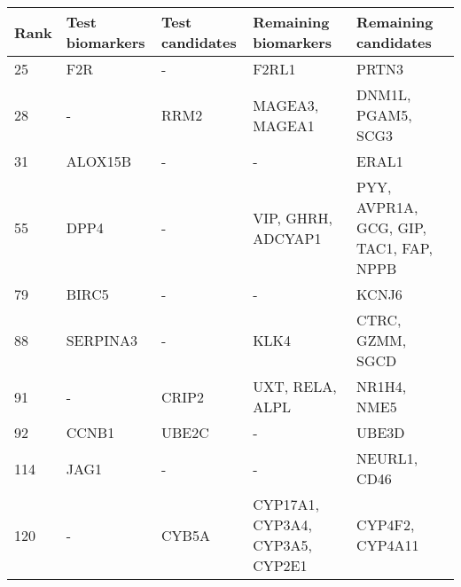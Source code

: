 \begin{sidewaystable}
    \begin{tabular}{|l|l|l|l|l|}
        \hline
        \textbf{Rank} 
        & \textbf{Test biomarkers} 
        & \textbf{Test candidates}
        & \textbf{Remaining biomarkers} 
        & \textbf{Remaining candidates} \\
        \hline
        25	& F2R	& -	& F2RL1	& PRTN3 \\
        \hline
        28	& -	& RRM2	& MAGEA3, MAGEA1	& DNM1L, PGAM5, SCG3 \\
        \hline
        31	& ALOX15B	& -	& -	& ERAL1 \\
        \hline
        55	& DPP4	& -	& VIP, GHRH, ADCYAP1	& PYY, AVPR1A, GCG, GIP, TAC1, FAP, NPPB \\
        \hline
        79	& BIRC5	& -	& -	& KCNJ6 \\
        \hline
        88	& SERPINA3	& -	& KLK4	& CTRC, GZMM, SGCD \\
        \hline
        91	& -	& CRIP2	& UXT, RELA, ALPL	& NR1H4, NME5 \\
        \hline
        92	& CCNB1	& UBE2C	& -	& UBE3D \\
        \hline
        114	& JAG1	& -	& -	& NEURL1, CD46 \\
        \hline
        120	& -	& CYB5A	& CYP17A1, CYP3A4, CYP3A5, CYP2E1	& CYP4F2, CYP4A11 \\
        \hline
    \end{tabular}
\end{sidewaystable}
